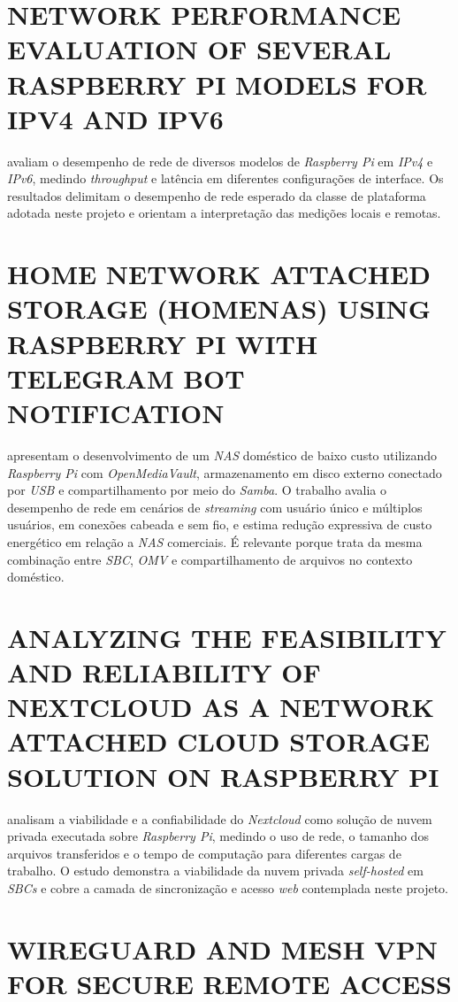 \section{NETWORK PERFORMANCE EVALUATION OF SEVERAL RASPBERRY PI MODELS FOR IPV4 AND IPV6}

 avaliam o desempenho de rede de diversos modelos de \textit{Raspberry Pi} em \textit{IPv4} e \textit{IPv6}, medindo \textit{throughput} e latência em diferentes configurações de interface. Os resultados delimitam o desempenho de rede esperado da classe de plataforma adotada neste projeto e orientam a interpretação das medições locais e remotas.

\section{HOME NETWORK ATTACHED STORAGE (HOMENAS) USING RASPBERRY PI WITH TELEGRAM BOT NOTIFICATION}

 apresentam o desenvolvimento de um \textit{NAS} doméstico de baixo custo utilizando \textit{Raspberry Pi} com \textit{OpenMediaVault}, armazenamento em disco externo conectado por \textit{USB} e compartilhamento por meio do \textit{Samba}. O trabalho avalia o desempenho de rede em cenários de \textit{streaming} com usuário único e múltiplos usuários, em conexões cabeada e sem fio, e estima redução expressiva de custo energético em relação a \textit{NAS} comerciais. É relevante porque trata da mesma combinação entre \textit{SBC}, \textit{OMV} e compartilhamento de arquivos no contexto doméstico.

\section{ANALYZING THE FEASIBILITY AND RELIABILITY OF NEXTCLOUD AS A NETWORK ATTACHED CLOUD STORAGE SOLUTION ON RASPBERRY PI}

 analisam a viabilidade e a confiabilidade do \textit{Nextcloud} como solução de nuvem privada executada sobre \textit{Raspberry Pi}, medindo o uso de rede, o tamanho dos arquivos transferidos e o tempo de computação para diferentes cargas de trabalho. O estudo demonstra a viabilidade da nuvem privada \textit{self-hosted} em \textit{SBCs} e cobre a camada de sincronização e acesso \textit{web} contemplada neste projeto.

\section{WIREGUARD AND MESH VPN FOR SECURE REMOTE ACCESS}

